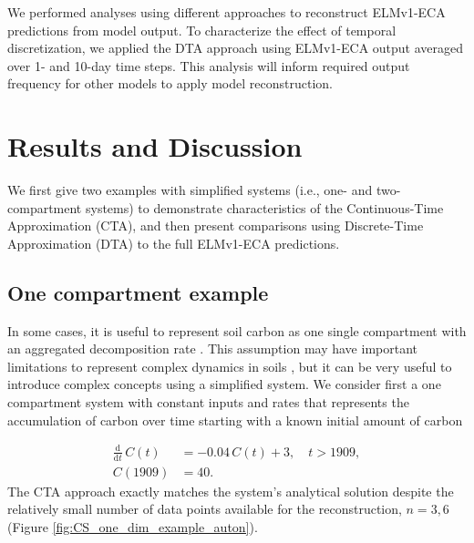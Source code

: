 \documentclass[draft]{agujournal2019}
\newcommand{\deriv}[1]{\frac{\mathrm{d}}{\mathrm{d}#1}}
\begin{document}
    We performed analyses using different approaches to reconstruct ELMv1-ECA predictions from model output. To characterize the effect of temporal discretization, we applied the DTA approach using ELMv1-ECA output averaged over 1- and 10-day time steps. This analysis will inform required output frequency for other models to apply model reconstruction. %

\section{Results and Discussion}
We first give two examples with simplified systems (i.e., one- and two-compartment systems) to demonstrate characteristics of the Continuous-Time Approximation (CTA), and then present comparisons using Discrete-Time Approximation (DTA) to the full ELMv1-ECA predictions. 

\subsection{One compartment example}
In some cases, it is useful to represent soil carbon as one single compartment with an aggregated decomposition rate \cite{Olson1963}. This assumption may have important limitations to represent complex dynamics in soils \cite{Manzoni2009SBB, Sierra2015}, but it can be very useful to introduce complex concepts using a simplified system.
We consider first a one compartment system with constant inputs and rates that represents the accumulation of carbon over time starting with a known initial amount of carbon

\begin{equation}\label{eqn:CS_one_dim_example_auton}
    \begin{aligned}
        \deriv{t}\,C(t) &= -0.04\,C(t) + 3,\quad t>1909,\\
        C(1909) &= 40.
    \end{aligned}
\end{equation}
The CTA approach exactly matches the system's analytical solution despite the relatively small number of data points available for the reconstruction, $n=3,6$ (Figure \ref{fig:CS_one_dim_example_auton}).
\end{document}
